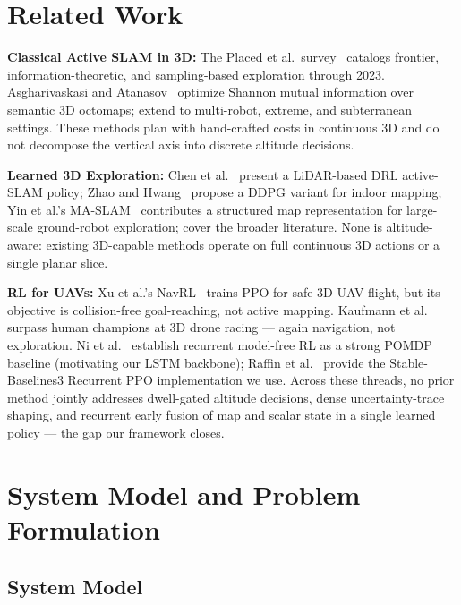 \documentclass[conference]{IEEEtran}
\begin{document}
\section{Related Work}

\textbf{Classical Active SLAM in 3D:} The Placed et al.\ survey~\cite{placed2023survey} catalogs frontier, information-theoretic, and sampling-based exploration through 2023. Asgharivaskasi and Atanasov~\cite{asgharivaskasi2023semantic} optimize Shannon mutual information over semantic 3D octomaps; \cite{asgharivaskasi2025riemannian, ebadi2023extreme, azpurua2023subterranean} extend to multi-robot, extreme, and subterranean settings. These methods plan with hand-crafted costs in continuous 3D and do not decompose the vertical axis into discrete altitude decisions.

\textbf{Learned 3D Exploration:} Chen et al.~\cite{chen2024lidar} present a LiDAR-based DRL active-SLAM policy; Zhao and Hwang~\cite{zhao2024ddpg} propose a DDPG variant for indoor mapping; Yin et al.'s MA-SLAM~\cite{yin2025maslam} contributes a structured map representation for large-scale ground-robot exploration; \cite{garaffa2023survey, wang2024exploration, botteghi2021curiosity} cover the broader literature. None is altitude-aware: existing 3D-capable methods operate on full continuous 3D actions or a single planar slice.

\textbf{RL for UAVs:} Xu et al.'s NavRL~\cite{xu2025navrl} trains PPO for safe 3D UAV flight, but its objective is collision-free goal-reaching, not active mapping. Kaufmann et al.~\cite{kaufmann2023racing} surpass human champions at 3D drone racing --- again navigation, not exploration. Ni et al.~\cite{ni2022recurrent} establish recurrent model-free RL as a strong POMDP baseline (motivating our LSTM backbone); Raffin et al.~\cite{raffin2021sb3} provide the Stable-Baselines3 Recurrent PPO implementation we use. Across these threads, no prior method jointly addresses dwell-gated altitude decisions, dense uncertainty-trace shaping, and recurrent early fusion of map and scalar state in a single learned policy --- the gap our framework closes.

\section{System Model and Problem Formulation}

\subsection{System Model}
\end{document}
